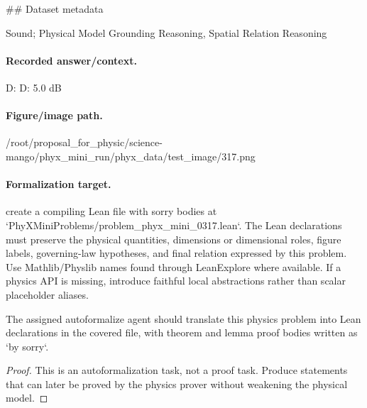 \#\# Dataset metadata

Sound; Physical Model Grounding Reasoning, Spatial Relation Reasoning

\paragraph{Recorded answer/context.}
D: D: 5.0 dB

\paragraph{Figure/image path.}
/root/proposal\_for\_physic/science-mango/phyx\_mini\_run/phyx\_data/test\_image/317.png

\paragraph{Formalization target.}
create a compiling Lean file with sorry bodies at `PhyXMiniProblems/problem\_phyx\_mini\_0317.lean`. The Lean declarations must preserve the physical quantities, dimensions or dimensional roles, figure labels, governing-law hypotheses, and final relation expressed by this problem.
Use Mathlib/Physlib names found through LeanExplore where available. If a physics API is missing, introduce faithful local abstractions rather than scalar placeholder aliases.

\begin{theorem}
\label{thm:physics:phyx_mini_0317:target}
The assigned autoformalize agent should translate this physics problem into Lean declarations in the covered file, with theorem and lemma proof bodies written as `by sorry`.
\end{theorem}
\begin{proof}
This is an autoformalization task, not a proof task. Produce statements that can later be proved by the physics prover without weakening the physical model.
\end{proof}

